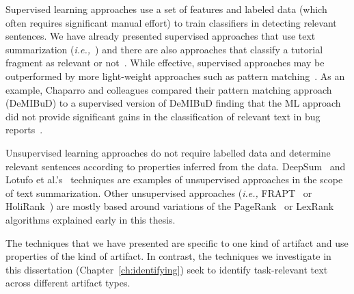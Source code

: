 Supervised learning approaches use a set of features and labeled data (which often requires significant manual effort) to train classifiers in detecting relevant sentences.
We have already presented supervised approaches that use text summarization (\textit{i.e.,}~\cite{Rastkar2010})
and there are also approaches that classify a tutorial fragment as relevant or not~\cite{Jiang2016b}.
While effective, supervised approaches may be outperformed by more light-weight approaches such as 
pattern matching~\cite{Bavota2016}.
As an example, Chaparro    
and colleagues 
compared their pattern matching approach ({\small DeMIBuD}) to a supervised version of {\small DeMIBuD} finding that the 
ML approach did not provide significant gains in the classification of relevant text in bug reports~\cite{Chaparro2017}.



Unsupervised learning approaches do not require labelled data and determine relevant sentences according to properties inferred from the data. DeepSum~\cite{Li2018} and Lotufo et al.'s~\cite{Lotufo2012} techniques are examples of unsupervised approaches in the scope of text summarization. Other unsupervised approaches (\textit{i.e.,} {\small FRAPT}~\cite{Jiang2017} or HoliRank~\cite{Ponzanelli2015, Ponzanelli2017}) are mostly based around variations of the PageRank~\cite{Page1999} or LexRank~\cite{Erkan2004} algorithms explained early in this thesis. 




The techniques that we have presented
are specific to one kind of artifact and use properties of the kind of
artifact. In contrast, the techniques we
investigate in this dissertation (Chapter~\ref{ch:identifying}) seek to identify 
task-relevant text across different artifact types.